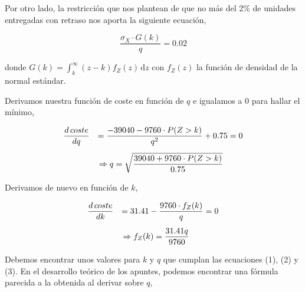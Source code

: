 \documentclass[a4paper,12pt]{article}
\begin{document}
Por otro lado, la restricci\'on que nos plantean de que no m\'as del 2\% de unidades entregadas con retraso nos aporta la siguiente ecuaci\'on,

\begin{equation}
\dfrac{\sigma_X \cdot G(k)}{q} = 0.02
\end{equation}

donde $G(k) = \int_k^\infty (z - k) f_Z(z)\, \mathrm{d}z $ con $f_Z(z)$ la funci\'on de densidad de la normal est\'andar. 

%
%

Derivamos nuestra funci\'on de coste en funci\'on de $q$ e igualamos a $0$ para hallar el m\'inimo,

\begin{equation}\label{ecq}
\begin{array}{l l}

\dfrac{d\text{\,}coste}{dq} & = \dfrac{-39040 - 9760\cdot P(Z > k)}{q^2} + 0.75 = 0\\[.5cm]

& \, \Rightarrow q = \sqrt{\dfrac{39040 + 9760\cdot P(Z > k)}{0.75}} 

\end{array}
\end{equation}


Derivamos de nuevo en funci\'on de $k$,

\begin{equation}\label{eck}
\begin{array}{l l}
\dfrac{d\text{\,}coste}{dk} & = 31.41 - \dfrac{9760\cdot f_Z(k)}{q} = 0 \\[.5cm]
& \, \Rightarrow f_Z(k) = \dfrac{31.41q}{9760}
\end{array}
\end{equation}

Debemos encontrar unos valores para $k$ y $q$ que cumplan las ecuaciones (1), (2) y (3). En el desarrollo te\'orico de los apuntes, podemos encontrar una f\'ormula parecida a la obtenida al derivar sobre $q$,
\end{document}
